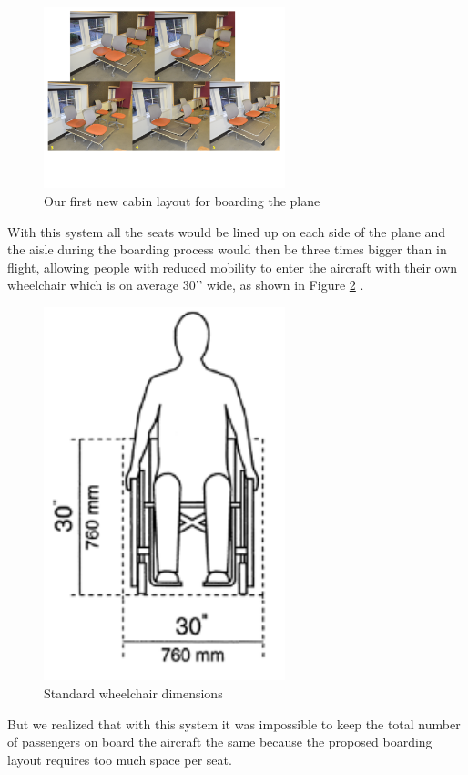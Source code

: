 \begin{figure}[h]
  \centering
     \includegraphics[width=7cm]{images/first_new_cabin_layout.png}
   \caption{Our first new cabin layout for boarding the plane}
  \label{fig:first_new_cabin_layout}
\end{figure} 

With this system all the seats would be lined up on each side of the plane and the aisle during the boarding process would then be three times bigger than in flight, allowing people with reduced mobility to enter the aircraft with their own wheelchair which is on average 30’’ wide, as shown in Figure \ref{fig:wheelchair_dimensions} .

\begin{figure}[h]
  \centering
     \includegraphics[width=7cm]{images/wheelchair_dimensions.png}
   \caption{Standard wheelchair dimensions}
  \label{fig:wheelchair_dimensions}
\end{figure}

But we realized that with this system it was impossible to keep the total number of passengers on board the aircraft the same because the proposed boarding layout requires too much space per seat. 

